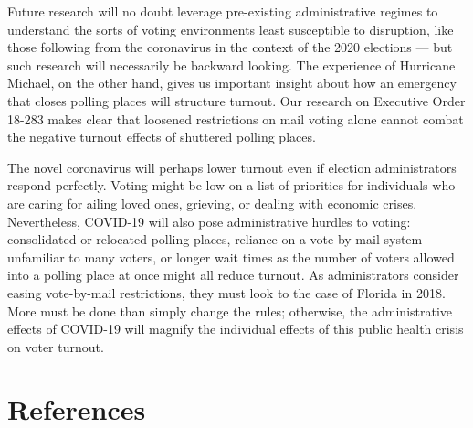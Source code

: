 \documentclass[
  12pt,
]{article}
\begin{document}
Future research will no doubt leverage pre-existing administrative regimes to understand the sorts of voting environments least susceptible to disruption, like those following from the coronavirus in the context of the 2020 elections --- but such research will necessarily be backward looking. The experience of Hurricane Michael, on the other hand, gives us important insight about how an emergency that closes polling places will structure turnout. Our research on Executive Order 18-283 makes clear that loosened restrictions on mail voting alone cannot combat the negative turnout effects of shuttered polling places.

The novel coronavirus will perhaps lower turnout even if election administrators respond perfectly. Voting might be low on a list of priorities for individuals who are caring for ailing loved ones, grieving, or dealing with economic crises. Nevertheless, COVID-19 will also pose administrative hurdles to voting: consolidated or relocated polling places, reliance on a vote-by-mail system unfamiliar to many voters, or longer wait times as the number of voters allowed into a polling place at once might all reduce turnout. As administrators consider easing vote-by-mail restrictions, they must look to the case of Florida in 2018. More must be done than simply change the rules; otherwise, the administrative effects of COVID-19 will magnify the individual effects of this public health crisis on voter turnout.

\newpage

\hypertarget{references}{%
\section*{References}\label{references}}
\end{document}
